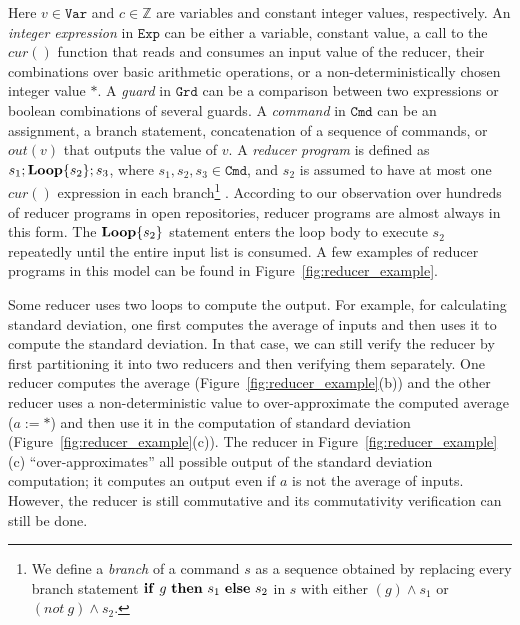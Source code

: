 \documentclass{llncs}
\newcommand{\Var}{\mathtt{Var}}
\newcommand{\Exp}{\mathtt{Exp}}
\newcommand{\Cmd}{\mathtt{Cmd}}
\newcommand{\Grd}{\mathtt{Grd}}
\newcommand{\cur}{cur()}
\newcommand{\ite}[3]{
	 \ifmmode 
	 \mathbf{if}\ #1 \ \mathbf{then}\ #2\  \mathbf{else}\ #3 
	 \else
	 \textbf{if}\ #1 \ \textbf{then}\ #2\  \textbf{else}\ #3
	 \fi}
\newcommand{\rloop}{
	\ifmmode 
	\mathbf{Loop}
	\else
	\textbf{Loop}
	\fi}
\newcommand{\Z}{\mathbb{Z}}
\begin{document}
Here $v\in \Var$ and $c \in \Z$ are variables and constant integer values, respectively. An \emph{integer expression} in $\Exp$ can be either a variable, constant value, a call to the $\cur$ function that reads and consumes an input value of the reducer, their combinations over basic arithmetic operations, or a non-deterministically chosen integer value $*$.
A \emph{guard} in $\Grd$ can be a comparison between two expressions or boolean combinations of several guards. A \emph{command} in $\Cmd$ can be an assignment, a branch statement, concatenation of a sequence of commands, or $out(v)$ that outputs the value of $v$.
A \emph{reducer program} is defined as $s_1;\rloop\{s_2\};s_3$, where $s_1,s_2,s_3 \in \Cmd$, and $s_2$ is assumed to have at most one $\cur$ expression in each branch\footnote{We define a \emph{branch} of a command $s$ as a sequence obtained by replacing every branch statement $\ite{g}{s_1}{s_2}$ in $s$ with either $(g)\wedge s_1$ or $(not\ g) \wedge s_2$.} . According to our observation over hundreds  of reducer programs in open repositories, reducer programs are almost always in this form. The $\rloop\{s_2\}$ statement enters the loop body to execute $s_2$ repeatedly until the entire input list is consumed. A few examples of reducer programs in this model can be found in Figure~\ref{fig:reducer_example}. 


Some reducer uses two loops to compute the output. For example, for calculating standard deviation, one first computes the average of inputs and then uses it to compute the standard deviation. In that case, we can still verify the reducer by first partitioning it into two reducers and then verifying them separately. One reducer computes the average (Figure~\ref{fig:reducer_example}(b)) and the other reducer uses a non-deterministic value to over-approximate the computed average ($a := *$) and then use it in the computation of standard deviation (Figure~\ref{fig:reducer_example}(c)). The reducer in Figure~\ref{fig:reducer_example}(c) ``over-approximates''  all possible output of the standard deviation computation; it computes an output even if $a$ is not the average of inputs. However, the reducer is still commutative and its commutativity verification can still be done.
\end{document}

